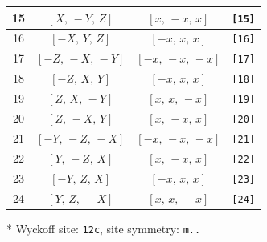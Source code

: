 \documentclass[fleqn,8pt]{jsarticle}
\begin{document}
\begin{longtable}{cccc}
15 & $\left[ X,\, - Y,\, Z \right]$ & $\left[ x,\, - x,\, x \right]$ & {\tt [15]} \\ \hline
16 & $\left[ - X,\, Y,\, Z \right]$ & $\left[ - x,\, x,\, x \right]$ & {\tt [16]} \\ \hline
17 & $\left[ - Z,\, - X,\, - Y \right]$ & $\left[ - x,\, - x,\, - x \right]$ & {\tt [17]} \\ \hline
18 & $\left[ - Z,\, X,\, Y \right]$ & $\left[ - x,\, x,\, x \right]$ & {\tt [18]} \\ \hline
19 & $\left[ Z,\, X,\, - Y \right]$ & $\left[ x,\, x,\, - x \right]$ & {\tt [19]} \\ \hline
20 & $\left[ Z,\, - X,\, Y \right]$ & $\left[ x,\, - x,\, x \right]$ & {\tt [20]} \\ \hline
21 & $\left[ - Y,\, - Z,\, - X \right]$ & $\left[ - x,\, - x,\, - x \right]$ & {\tt [21]} \\ \hline
22 & $\left[ Y,\, - Z,\, X \right]$ & $\left[ x,\, - x,\, x \right]$ & {\tt [22]} \\ \hline
23 & $\left[ - Y,\, Z,\, X \right]$ & $\left[ - x,\, x,\, x \right]$ & {\tt [23]} \\ \hline
24 & $\left[ Y,\, Z,\, - X \right]$ & $\left[ x,\, x,\, - x \right]$ & {\tt [24]} \\
\end{longtable}
* Wyckoff site: {\tt 12c}, site symmetry: {\tt m..}
\renewcommand{\arraystretch}{1.2}
\end{document}

